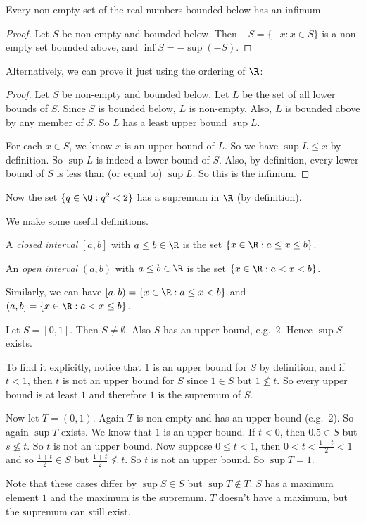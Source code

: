 \documentclass[a4paper]{article}
\begin{document}
\begin{cor}
  Every non-empty set of the real numbers bounded below has an infimum.
\end{cor}

\begin{proof}
  Let $S$ be non-empty and bounded below. Then $-S = \{-x: x\in S\}$ is a non-empty set bounded above, and $\inf S = -\sup (-S)$.
\end{proof}

Alternatively, we can prove it just using the ordering of $\R$:
\begin{proof}
  Let $S$ be non-empty and bounded below. Let $L$ be the set of all lower bounds of $S$. Since $S$ is bounded below, $L$ is non-empty. Also, $L$ is bounded above by any member of $S$. So $L$ has a least upper bound $\sup L$.

  For each $x \in S$, we know $x$ is an upper bound of $L$. So we have $\sup L \leq x$ by definition. So $\sup L$ is indeed a lower bound of $S$. Also, by definition, every lower bound of $S$ is less than (or equal to) $\sup L$. So this is the infimum.
\end{proof}

Now the set $\{q\in \Q: q^2 < 2\}$ has a supremum in $\R$ (by definition).

We make some useful definitions.
\begin{defi}
  A \emph{closed interval} $[a, b]$ with $a \leq b\in \R$ is the set $\{x\in \R: a\leq x\leq b\}$.

  An \emph{open interval} $(a, b)$ with $a \leq b\in \R$ is the set $\{x\in \R: a< x< b\}$.

  Similarly, we can have $[a, b) = \{x\in \R: a\leq x < b\}$ and $(a, b] = \{x\in \R: a< x \leq b\}$.
\end{defi}

\begin{eg}
  Let $S = [0, 1]$. Then $S\not= \emptyset$. Also $S$ has an upper bound, e.g.\ $2$. Hence $\sup S$ exists.

  To find it explicitly, notice that $1$ is an upper bound for $S$ by definition, and if $t < 1$, then $t$ is not an upper bound for $S$ since $1\in S$ but $1\not\leq t$. So every upper bound is at least $1$ and therefore $1$ is the supremum of $S$.

  Now let $T = (0, 1)$. Again $T$ is non-empty and has an upper bound (e.g.\ $2$). So again $\sup T$ exists. We know that $1$ is an upper bound. If $t < 0$, then $0.5\in S$ but $s\not\leq t$. So $t$ is not an upper bound. Now suppose $0\leq t < 1$, then $0 < t < \frac{1 + t}{2} < 1$ and so $\frac{1 + t}{2}\in S$ but $\frac{1 + t}{2} \not\leq t$. So $t$ is not an upper bound. So $\sup T = 1$.

  Note that these cases differ by $\sup S\in S$ but $\sup T\not\in T$. $S$ has a maximum element $1$ and the maximum is the supremum. $T$ doesn't have a maximum, but the supremum can still exist.
\end{eg}
\end{document}
